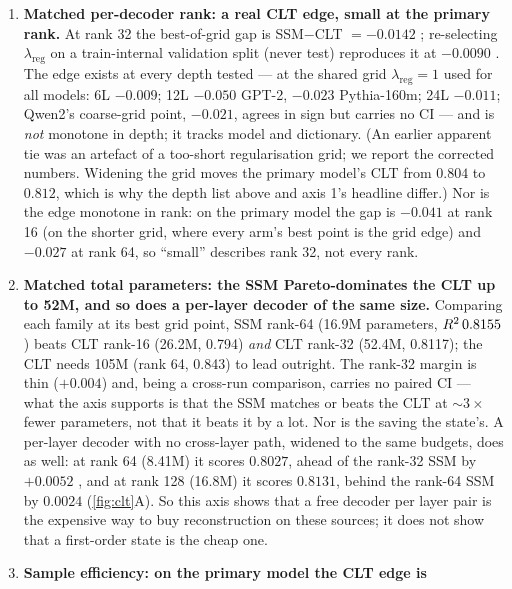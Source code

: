 \begin{enumerate}
  \item \textbf{Matched per-decoder rank: a real CLT edge, small at the
    primary rank.} At rank 32
    the best-of-grid gap is SSM$-$CLT $= -0.0142$ ;
    re-selecting $\lambda_{\mathrm{reg}}$ on a train-internal validation split
    (never test) reproduces it at \textbf{$-0.0090$ }.
    The edge exists at every depth tested --- at the shared grid
    $\lambda_{\mathrm{reg}}{=}1$ used for all models: 6L $-0.009$; 12L
    $-0.050$ GPT-2, $-0.023$ Pythia-160m; 24L $-0.011$; Qwen2's coarse-grid
    point, $-0.021$, agrees in sign but carries no CI --- and is \emph{not}
    monotone in depth; it tracks model and dictionary. (An earlier apparent tie
    was an artefact of a too-short regularisation grid; we report the corrected
    numbers. Widening the grid moves the primary model's CLT from $0.804$ to
    $0.812$, which is why the depth list above and axis 1's headline differ.)
    Nor is the edge monotone in rank: on the primary model the gap is
    $-0.041$ at rank 16 (on the shorter grid, where every arm's best point
    is the grid edge) and $-0.027$  at rank 64, so
    ``small'' describes rank 32, not every rank.
  \item \textbf{Matched total parameters: the SSM Pareto-dominates the CLT up
    to 52M, and so does a per-layer decoder of the same size.} Comparing each
    family at its best grid point, SSM rank-64 (16.9M
    parameters, $R^2\,0.8155$) beats CLT rank-16 (26.2M, 0.794) \emph{and}
    CLT rank-32 (52.4M, 0.8117); the CLT needs 105M (rank 64, 0.843) to lead
    outright. The rank-32 margin is thin ($+0.004$) and, being a cross-run
    comparison, carries no paired CI --- what the axis supports is that the
    SSM matches or beats the CLT at ${\sim}3\times$ fewer parameters, not that
    it beats it by a lot. Nor is the saving the state's. A per-layer decoder
    with no cross-layer path, widened to the same budgets, does as well: at
    rank 64 (8.41M) it scores $0.8027$, ahead of the rank-32 SSM by $+0.0052$
    , and at rank 128 (16.8M) it scores $0.8131$,
    behind the rank-64 SSM by $0.0024$ 
    (\cref{fig:clt}A). So this axis shows that a free decoder per layer pair
    is the expensive way to buy reconstruction on these sources; it does not
    show that a first-order state is the cheap one.
  \item \textbf{Sample efficiency: on the primary model the CLT edge is
}
\end{enumerate}
